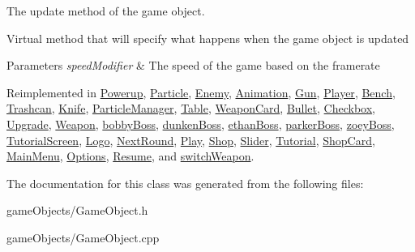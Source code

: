 The update method of the game object. 

Virtual method that will specify what happens when the game object is updated 
\begin{DoxyParams}{Parameters}
{\em speed\+Modifier} & The speed of the game based on the framerate \\
\hline
\end{DoxyParams}


Reimplemented in \hyperlink{class_powerup_a9e2f40a979bbc15787a607871b6644ce}{Powerup}, \hyperlink{class_particle_a9bd18a091946b1814f685118dfe66a1e}{Particle}, \hyperlink{class_enemy_a5509b06f70a649c4ea9d1fb06f07cb5c}{Enemy}, \hyperlink{class_animation_ae17ebf5f4b47801e460eb63342d858e8}{Animation}, \hyperlink{class_gun_ae7cbc34b103c1e89b4536309582dafb5}{Gun}, \hyperlink{class_player_a70e7b6ef62c5b8080e454edcb15cacc8}{Player}, \hyperlink{class_bench_abb815aa9afeee6e72fa93db3d51cf1a1}{Bench}, \hyperlink{class_trashcan_a6d44d844ec5c4155158b4e4d5fc222a4}{Trashcan}, \hyperlink{class_knife_ac861c5829858e00f82cbfdddb4a7d0b4}{Knife}, \hyperlink{class_particle_manager_a2c786926fc1cd9992c518b3ea4ee07cb}{Particle\+Manager}, \hyperlink{class_table_af37e903447fa51718b7ad49dd2d4dbc3}{Table}, \hyperlink{class_weapon_card_a160dc14db9e74b67537e74fcbf0a6e75}{Weapon\+Card}, \hyperlink{class_bullet_acfcfcf7146d04ad78520292c55ca6eee}{Bullet}, \hyperlink{class_checkbox_af8103187e6df3f44b010a098d7473b55}{Checkbox}, \hyperlink{class_upgrade_a66b04bde03bdf6ad0935b98963619444}{Upgrade}, \hyperlink{class_weapon_a098b1074ff1099e9fbd83d1186b8f18f}{Weapon}, \hyperlink{classbobby_boss_a1ba19c55017f2fb3f0b1679d82095d78}{bobby\+Boss}, \hyperlink{classdunken_boss_ad9ae91ab3ce0b97ee48ab90203c7e4fd}{dunken\+Boss}, \hyperlink{classethan_boss_a6e47b12c5e718ecee5d888bcde580c1a}{ethan\+Boss}, \hyperlink{classparker_boss_a5f82194f8880924981fccd4bf611f324}{parker\+Boss}, \hyperlink{classzoey_boss_aa712b8f9050e3851cb0133927acd3f54}{zoey\+Boss}, \hyperlink{class_tutorial_screen_a67f9d997c5702c3ee032d7070d6363ec}{Tutorial\+Screen}, \hyperlink{class_logo_a3c7f6eb9479e2594652d2a2f60c77e21}{Logo}, \hyperlink{class_next_round_ab6c2cb6a601f19c9898f962973c765c2}{Next\+Round}, \hyperlink{class_play_ae8b65105669a71c09901aae7b7e6f764}{Play}, \hyperlink{class_shop_a80125375c97c1028281e9458885ac0f0}{Shop}, \hyperlink{class_slider_a762b3a7ca00a3a665a1aeceba2e54fac}{Slider}, \hyperlink{class_tutorial_aeaa7fe8ebcd65dc23ca2df5c73ba5a48}{Tutorial}, \hyperlink{class_shop_card_a3f71274bdfc6c739969439975a3f0711}{Shop\+Card}, \hyperlink{class_main_menu_a41b86746c468d18532123dfda01425de}{Main\+Menu}, \hyperlink{class_options_aa331e18456d83724b67f94a0827118c4}{Options}, \hyperlink{class_resume_a79207ae2fa394f8a2d0754fef119854d}{Resume}, and \hyperlink{classswitch_weapon_a63fe71ba783dce920b6180efb2258735}{switch\+Weapon}.



The documentation for this class was generated from the following files\+:\begin{DoxyCompactItemize}
\item 
game\+Objects/Game\+Object.\+h\item 
game\+Objects/Game\+Object.\+cpp\end{DoxyCompactItemize}
